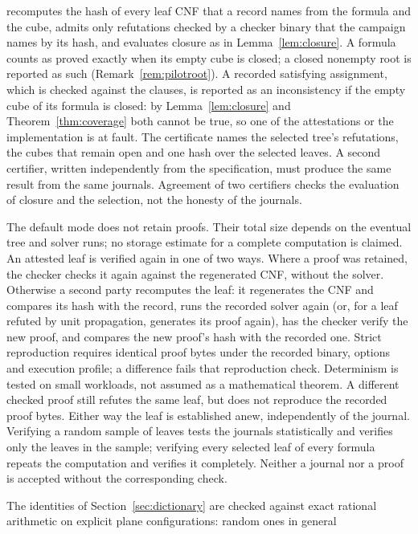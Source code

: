 \documentclass[11pt,reqno]{amsart}
\theoremstyle{plain}
\theoremstyle{definition}
\begin{document}
\begin{description}[leftmargin=1.6em,style=nextline]
  recomputes the hash of every leaf CNF that a record names from the formula and the cube, admits
  only refutations checked by a checker binary that the campaign names by its hash, and evaluates
  closure as in Lemma~\ref{lem:closure}. A formula counts as proved exactly when its empty cube is
  closed; a closed nonempty root is reported as such (Remark~\ref{rem:pilotroot}). A recorded
  satisfying assignment, which is checked against the clauses, is reported as an inconsistency
  if the empty cube of its formula is closed: by Lemma~\ref{lem:closure} and
  Theorem~\ref{thm:coverage} both cannot be true,
  so one of the attestations or the implementation is at fault. The certificate names the selected tree's refutations, the cubes
  that remain open and one hash over the selected leaves. A second certifier, written independently
  from the specification, must produce the same result from the same journals. Agreement of two
  certifiers checks the evaluation of closure and the selection, not the honesty of the journals.
\item[Independent verification] The default mode does not retain proofs. Their total size
  depends on the eventual tree and solver runs; no storage estimate for a complete
  computation is claimed. An attested leaf is verified again in one of two ways. Where a proof was retained,
  the checker checks it again against the regenerated CNF, without the solver. Otherwise a second
  party recomputes the leaf: it regenerates the CNF and compares its hash with the record, runs the
  recorded solver again (or, for a leaf refuted by unit propagation, generates its proof again),
  has the checker verify the new proof, and compares the new proof's hash with the recorded one. Strict reproduction requires identical proof bytes under the recorded binary, options
  and execution profile; a difference fails that reproduction check. Determinism is tested
  on small workloads, not assumed as a mathematical theorem. A different checked proof
  still refutes the same leaf, but does not reproduce the recorded proof bytes. Either way
  the leaf is established anew, independently of the journal. Verifying a random sample of leaves
  tests the journals statistically and verifies only the leaves in the sample; verifying every
  selected leaf of every formula repeats the computation and verifies it completely. Neither a
  journal nor a proof is accepted without the corresponding check.
\item[Exact controls and a reference encoder] The identities of Section~\ref{sec:dictionary} are
  checked against exact rational arithmetic on explicit plane configurations: random ones in general

\end{description}
\end{document}
